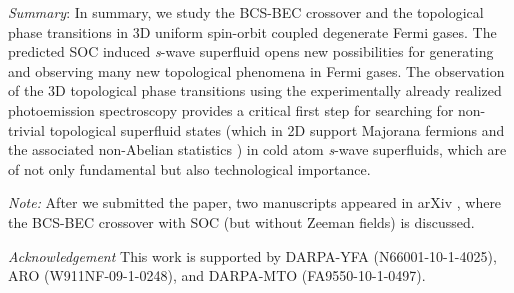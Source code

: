 \documentclass[prl,showpacs,twocolumn]{revtex4-1}
\begin{document}
\emph{Summary}: In summary, we study the BCS-BEC crossover and the
topological phase transitions in 3D uniform spin-orbit coupled degenerate
Fermi gases. The predicted SOC induced \textit{s}-wave superfluid opens new
possibilities for generating and observing many new topological phenomena in
Fermi gases. The observation of the 3D topological phase transitions using
the experimentally already realized photoemission spectroscopy provides a
critical first step for searching for non-trivial topological superfluid
states (which in 2D support Majorana fermions and the associated non-Abelian
statistics \cite{Nayak,Sau}) in cold atom \textit{s}-wave superfluids, which
are of not only fundamental but also technological importance.

\emph{Note:} After we submitted the paper, two manuscripts appeared in arXiv
\cite{Zhai,Hui}, where the BCS-BEC crossover with SOC (but without Zeeman
fields) is discussed.

\emph{Acknowledgement} This work is supported by DARPA-YFA
(N66001-10-1-4025), ARO (W911NF-09-1-0248), and DARPA-MTO (FA9550-10-1-0497).
\end{document}
